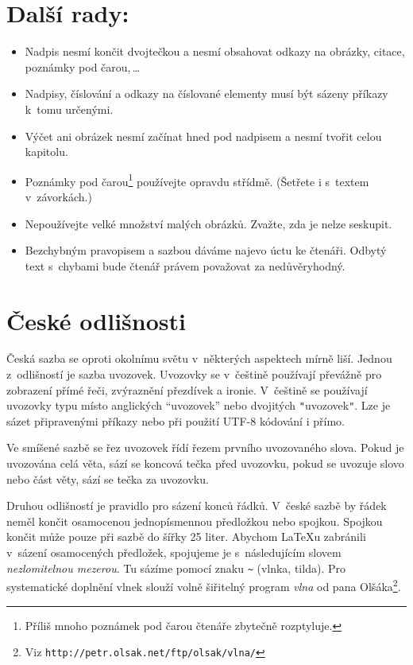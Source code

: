 \documentclass[10pt,twocolumn,a4paper]{article}
\begin{document}
\section{Další rady:} \label{sec:dalsirady}

\begin{itemize}
\item{Nadpis nesmí končit dvojtečkou a nesmí obsahovat odkazy na obrázky, citace, poznámky pod čarou,\,\dots}

\item{Nadpisy, číslování a odkazy na číslované elementy musí být sázeny příkazy k~tomu určenými.}

\item{Výčet ani obrázek nesmí začínat hned pod nadpisem a nesmí tvořit celou kapitolu.}

\item{Poznámky pod čarou\footnote{Příliš mnoho poznámek pod čarou čtenáře zbytečně rozptyluje.} používejte opravdu střídmě. (Šetřete i s~textem v~závorkách.)}

\item{Nepoužívejte velké množství malých obrázků. Zvažte, zda je nelze seskupit.}

\item{Bezchybným pravopisem a sazbou dáváme najevo úctu ke čtenáři. Odbytý text s~chybami bude čtenář právem považovat za nedůvěryhodný.}
\end{itemize}

\section{České odlišnosti}

Česká sazba se oproti okolnímu světu v~některých aspektech mírně liší. Jednou z~odlišností je sazba uvozovek. Uvozovky se v~češtině používají převážně pro zobrazení přímé řeči, zvýraznění přezdívek a ironie. V~češtině se používají uvozovky typu  místo anglických ``uvozovek''  nebo dvojitých \texttt{"}uvozovek\texttt{"}. Lze je sázet připravenými příkazy nebo při použití UTF-8 kódování i přímo.

Ve smíšené sazbě se řez uvozovek řídí řezem prvního uvozovaného slova. Pokud je uvozována celá věta, sází se koncová tečka před uvozovku, pokud se uvozuje slovo nebo část věty, sází se tečka za uvozovku.

Druhou odlišností je pravidlo pro sázení konců řádků. V~české sazbě by řádek neměl končit osamocenou jednopísmennou předložkou nebo spojkou. Spojkou  končit může pouze při sazbě do šířky 25 liter. Abychom \LaTeX u zabránili v~sázení osamocených předložek, spojujeme je s~následujícím slovem \emph{nezlomitelnou mezerou}. Tu sázíme pomocí znaku \verb|~| (vlnka, tilda). Pro systematické doplnění vlnek slouží volně šiřitelný program \emph{vlna} od pana Olšáka\footnote{Viz \texttt{http://petr.olsak.net/ftp/olsak/vlna/}}.
\end{document}
